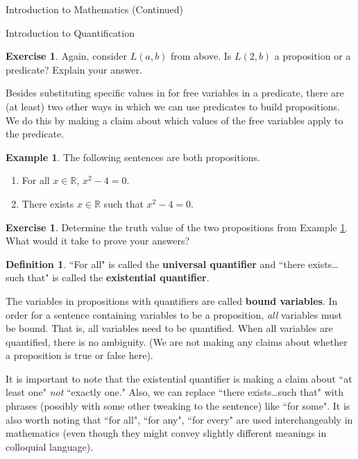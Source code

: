 \documentclass[11pt]{article}
\theoremstyle{definition}
\newtheorem{definition}[theorem]{Definition}
\newtheorem{example}[theorem]{Example}
\newtheorem{exercise}[theorem]{Exercise}
\begin{document}
\begin{section}{Introduction to Mathematics (Continued)}
\begin{subsection}{Introduction to Quantification}
\begin{exercise}
Again, consider $L(a,b)$ from above.  Is $L(2,b)$ a proposition or a predicate?  Explain your answer.
\end{exercise}

Besides substituting specific values in for free variables in a predicate, there are (at least) two other ways in which we can use predicates to build propositions.  We do this by making a claim about which values of the free variables apply to the predicate.

\begin{example}\label{ex:quantified predicates}
The following sentences are both propositions.
\begin{enumerate}
\item For all $x\in\mathbb{R}$, $x^2-4=0$.
\item There exists $x\in\mathbb{R}$ such that $x^2-4=0$.
\end{enumerate}
\end{example}

\begin{exercise}
Determine the truth value of the two propositions from Example \ref{ex:quantified predicates}.  What would it take to prove your answers?
\end{exercise}

\begin{definition}
``For all" is called the \textbf{universal quantifier} and ``there exists\ldots such that" is called the \textbf{existential quantifier}.
\end{definition}

The variables in propositions with quantifiers are called \textbf{bound variables}.  In order for a sentence containing variables to be a proposition, \emph{all} variables must be bound.  That is, all variables need to be quantified.  When all variables are quantified, there is no ambiguity.  (We are not making any claims about whether a proposition is true or false here).

It is important to note that the existential quantifier is making a claim about ``at least one" \emph{not} ``exactly one."    Also, we can replace ``there exists\ldots such that" with phrases (possibly with some other tweaking to the sentence) like ``for some".  It is also worth noting that ``for all", ``for any", ``for every" are used interchangeably in mathematics (even though they might convey slightly different meanings in colloquial language).  


\end{subsection}
\end{section}
\end{document}
